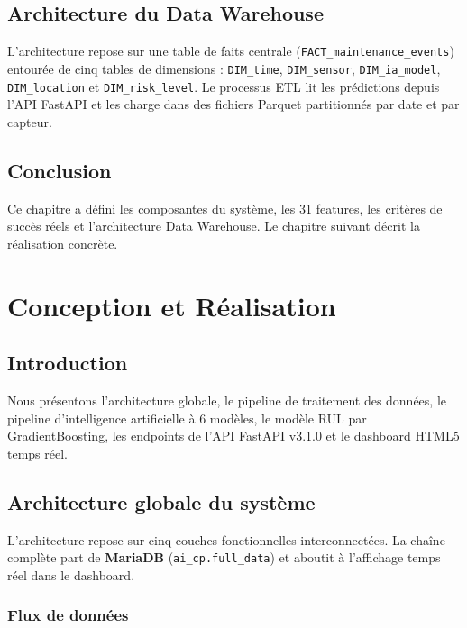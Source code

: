 \documentclass[12pt,a4paper]{report}
\begin{document}
\section{Architecture du Data Warehouse}

L'architecture repose sur une table de faits centrale (\texttt{FACT\_maintenance\_events})
entourée de cinq tables de dimensions : \texttt{DIM\_time}, \texttt{DIM\_sensor}, \texttt{DIM\_ia\_model},
\texttt{DIM\_location} et \texttt{DIM\_risk\_level}. Le processus ETL lit les prédictions depuis l'API
FastAPI et les charge dans des fichiers Parquet partitionnés par date et par capteur.

\section{Conclusion}

Ce chapitre a défini les composantes du système, les 31 features, les critères de succès réels et l'architecture Data Warehouse. Le chapitre suivant décrit la réalisation concrète.

\chapter{Conception et Réalisation}

\section{Introduction}

Nous présentons l'architecture globale, le pipeline de traitement des données, le
pipeline d'intelligence artificielle à 6 modèles, le modèle RUL par GradientBoosting,
les endpoints de l'API FastAPI v3.1.0 et le dashboard HTML5 temps réel.

\section{Architecture globale du système}

L'architecture repose sur cinq couches fonctionnelles interconnectées. La chaîne
complète part de \textbf{MariaDB} (\texttt{ai\_cp.full\_data}) et aboutit à l'affichage
temps réel dans le dashboard.

\subsection{Flux de données}
\end{document}
